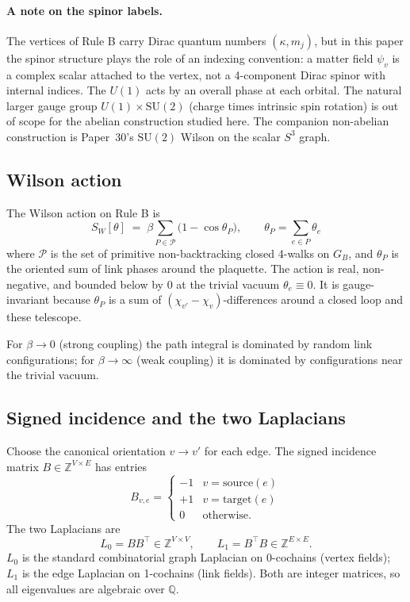\documentclass[11pt]{article}
\begin{document}
\paragraph{A note on the spinor labels.} The vertices of Rule B carry Dirac
quantum numbers $(\kappa,m_j)$, but in this paper the spinor structure plays the
role of an indexing convention: a matter field $\psi_v$ is a complex scalar
attached to the vertex, not a 4-component Dirac spinor with internal indices.
The $U(1)$ acts by an overall phase at each orbital. The natural larger gauge
group $U(1)\times \mathrm{SU}(2)$ (charge times intrinsic spin rotation) is out of
scope for the abelian construction studied here. The companion non-abelian
construction is Paper~30's $\mathrm{SU}(2)$ Wilson on the scalar $S^3$ graph.

\subsection{Wilson action}
\label{sec:wilson_action}

The Wilson action on Rule B is
\begin{equation}
S_W[\theta]\;=\;\beta\sum_{P\in\mathcal P}\bigl(1-\cos\theta_P\bigr),
\qquad
\theta_P=\sum_{e\in P}\theta_e
\label{eq:wilson_action}
\end{equation}
where $\mathcal P$ is the set of primitive non-backtracking closed 4-walks on
$G_B$, and $\theta_P$ is the oriented sum of link phases around the plaquette.
The action is real, non-negative, and bounded below by 0 at the trivial vacuum
$\theta_e\equiv 0$. It is gauge-invariant because $\theta_P$ is a sum of
$(\chi_{v'}-\chi_v)$-differences around a closed loop and these telescope.

For $\beta\to 0$ (strong coupling) the path integral is dominated by random
link configurations; for $\beta\to\infty$ (weak coupling) it is dominated by
configurations near the trivial vacuum.

\subsection{Signed incidence and the two Laplacians}
\label{sec:hodge_laplacians}

Choose the canonical orientation $v\to v'$ for each edge. The signed incidence
matrix $B\in\mathbb{Z}^{V\times E}$ has entries
\begin{equation}
B_{v,e}=\begin{cases}
-1 & v=\text{source}(e)\\
+1 & v=\text{target}(e)\\
0 & \text{otherwise.}
\end{cases}
\end{equation}
The two Laplacians are
\begin{equation}
L_0=BB^\top\in\mathbb{Z}^{V\times V},
\qquad
L_1=B^\top B\in\mathbb{Z}^{E\times E}.
\end{equation}
$L_0$ is the standard combinatorial graph Laplacian on 0-cochains (vertex
fields); $L_1$ is the edge Laplacian on 1-cochains (link fields). Both are
integer matrices, so all eigenvalues are algebraic over $\mathbb{Q}$.
\end{document}
